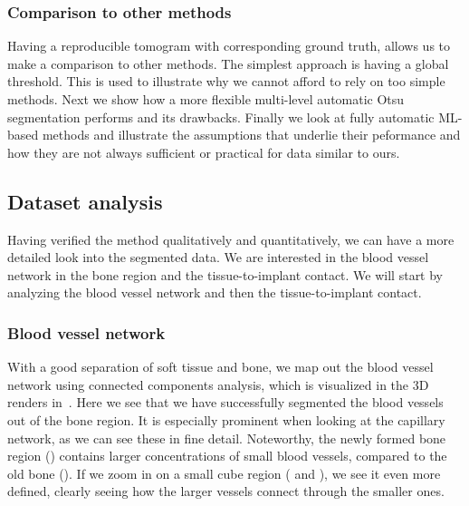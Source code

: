 \subsubsection{Comparison to other methods}

Having a reproducible tomogram with corresponding ground truth, allows us to
make a comparison to other methods. The simplest approach is having a global
threshold. This is used to illustrate why we cannot afford to rely on too
simple methods.  Next we show how a more flexible multi-level automatic Otsu
segmentation performs and its drawbacks. Finally we look at fully automatic
ML-based methods and illustrate the assumptions that underlie their peformance
and how they are not always sufficient or practical for data similar to ours.

\subsection{Dataset analysis}

Having verified the method qualitatively and quantitatively, we can have a more
detailed look into the segmented data. We are interested in the blood vessel
network in the bone region and the tissue-to-implant contact. We will start by
analyzing the blood vessel network and then the tissue-to-implant contact.

\subsubsection{Blood vessel network}
\label{sec:blood-network}

With a good separation of soft tissue and bone, we map out the blood vessel
network using connected components analysis, which is visualized in the 3D
renders in~. Here we see that we have successfully
segmented the blood vessels out of the bone region. It is especially prominent
when looking at the capillary network, as we can see these in fine detail.
Noteworthy, the newly formed bone region () contains
larger concentrations of small blood vessels, compared to the old bone
(). If we zoom in on a small cube region
( and ), we see it even more
defined, clearly seeing how the larger vessels connect through the smaller
ones.

